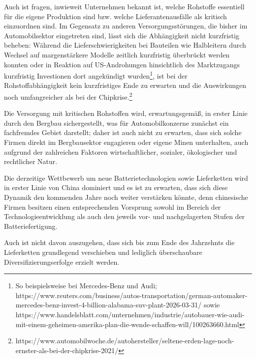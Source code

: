 \documentclass[12pt,a4paper,oneside]{book} %
\begin{document}
{Auch ist fragen, inwieweit Unternehmen bekannt ist, welche Rohstoffe essentiell für die eigene Produktion sind bzw. welche Lieferantenausfälle als kritisch einzuordnen sind. Im Gegensatz zu anderen Versorgungsstörungen, die bisher im Automobilsektor eingetreten sind, lässt sich die Abhängigkeit nicht kurzfristig beheben: Während die Lieferschwierigkeiten bei Bauteilen wie Halbleitern durch Wechsel auf margenstärkere Modelle zeitlich kurzfristig überbrückt werden konnten\autocite{https://www.pwc.de/de/automobilindustrie/auswirkungen-der-halbleiterkrise-auf-die-deutsche-automotive-zulieferindustrie-pwc.pdf} oder in Reaktion auf US-Androhungen hinsichtlich des Marktzugangs kurzfristig Investionen dort angekündigt wurden\footnote{So beispielsweise bei Mercedes-Benz und Audi; https://www.reuters.com/business/autos-transportation/german-automaker-mercedes-benz-invest-4-billion-alabama-suv-plant-2026-03-31/ sowie https://www.handelsblatt.com/unternehmen/industrie/autobauer-wie-audi-mit-einem-geheimen-amerika-plan-die-wende-schaffen-will/100263660.html}, ist bei der Rohstoffabhängigkeit kein kurzfristiges Ende zu erwarten und die Auswirkungen noch umfangreicher als bei der Chipkrise.\footnote{https://www.automobilwoche.de/autohersteller/seltene-erden-lage-noch-ernster-als-bei-der-chipkrise-2021/}

Die Versorgung mit kritischen Rohstoffen wird, erwartungsgemäß, in erster Linie durch den Bergbau sichergestellt, was für Automobilkonzerne zunächst ein fachfremdes Gebiet darstellt; daher ist auch nicht zu erwarten, dass sich solche Firmen direkt im Bergbausektor engagieren oder eigene Minen unterhalten, auch aufgrund der zahlreichen Faktoren wirtschaftlicher, sozialer, ökologischer und rechtlicher Natur.

Die derzeitige Wettbewerb um neue Batterietechnologien sowie Lieferketten wird in erster Linie von China dominiert und es ist zu erwarten, dass sich diese Dynamik den kommenden Jahre noch weiter verstärken könnte, denn chinesische Firmen besitzen einen entsprechenden Vorsprung sowohl im Bereich der Technologieentwicklung als auch den jeweils vor- und nachgelagerten Stufen der Batteriefertigung.

Auch ist nicht davon auszugehen, dass sich bis zum Ende des Jahrzehnts die Lieferketten grundlegend verschieben und lediglich überschaubare Diversifizierungserfolge erzielt werden.\autocite{https://www.mckinsey.com/industries/automotive-and-assembly/our-insights/battery-2030-resilient-sustainable-and-circular}

}
\end{document}
